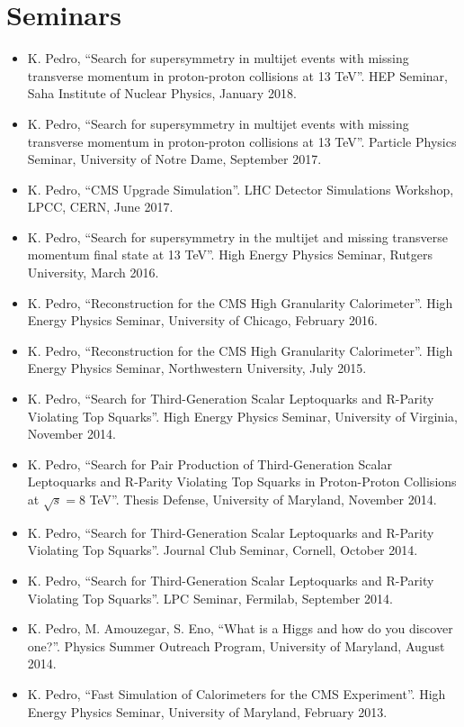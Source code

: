 \section{Seminars}
\begin{itemize}[leftmargin=12pt]
\item K. Pedro, ``Search for supersymmetry in multijet events with missing transverse momentum in proton-proton collisions at 13 TeV''. HEP Seminar, Saha Institute of Nuclear Physics, January 2018.
\item K. Pedro, ``Search for supersymmetry in multijet events with missing transverse momentum in proton-proton collisions at 13 TeV''. Particle Physics Seminar, University of Notre Dame, September 2017.
\item K. Pedro, ``CMS Upgrade Simulation''. LHC Detector Simulations Workshop, LPCC, CERN, June 2017.
\item K. Pedro, ``Search for supersymmetry in the multijet and missing transverse momentum final state at 13 TeV''. High Energy Physics Seminar, Rutgers University, March 2016.
\item K. Pedro, ``Reconstruction for the CMS High Granularity Calorimeter''. High Energy Physics Seminar, University of Chicago, February 2016.
\item K. Pedro, ``Reconstruction for the CMS High Granularity Calorimeter''. High Energy Physics Seminar, Northwestern University, July 2015.
\item K. Pedro, ``Search for Third-Generation Scalar Leptoquarks and R-Parity Violating Top Squarks''. High Energy Physics Seminar, University of Virginia, November 2014.
\item K. Pedro, ``Search for Pair Production of Third-Generation Scalar Leptoquarks and R-Parity Violating Top Squarks in Proton-Proton Collisions at $\sqrt{s}=8$ TeV''. Thesis Defense, University of Maryland, November 2014.
\item K. Pedro, ``Search for Third-Generation Scalar Leptoquarks and R-Parity Violating Top Squarks''. Journal Club Seminar, Cornell, October 2014.
\item K. Pedro, ``Search for Third-Generation Scalar Leptoquarks and R-Parity Violating Top Squarks''. LPC Seminar, Fermilab, September 2014.
\item K. Pedro, M. Amouzegar, S. Eno, ``What is a Higgs and how do you discover one?''. Physics Summer Outreach Program, University of Maryland, August 2014.
\item K. Pedro, ``Fast Simulation of Calorimeters for the CMS Experiment''. High Energy Physics Seminar, University of Maryland, February 2013.
\end{itemize}
\fi


